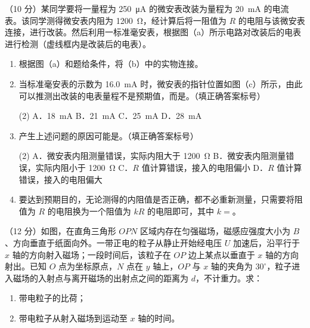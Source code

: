 \begin{question}
（10 分）某同学要将一量程为 \SI{250}{\micro\ampere} 的微安表改装为量程为 \SI{20}{\milli\ampere} 的电流表。该同学测得微安表内阻为 \SI{1200}{\ohm}，经计算后将一阻值为 $R$ 的电阻与该微安表连接，进行改装。然后利用一标准毫安表，根据图（a）所示电路对改装后的电表进行检测（虚线框内是改装后的电表）。


\begin{enumerate}[leftmargin=2em, label=(\arabic*)]
  \item 根据图（a）和题给条件，将（b）中的实物连接。
  \item 当标准毫安表的示数为 \SI{16.0}{\milli\ampere} 时，微安表的指针位置如图（c）所示，由此可以推测出改装的电表量程不是预期值，而是\gkblank。（填正确答案标号）
        \begin{gkopts}(2)
          \task A．\SI{18}{\milli\ampere}
          \task B．\SI{21}{\milli\ampere}
          \task C．\SI{25}{\milli\ampere}
          \task D．\SI{28}{\milli\ampere}
        \end{gkopts}
  \item 产生上述问题的原因可能是\gkblank。（填正确答案标号）
        \begin{gkopts}(2)
          \task A．微安表内阻测量错误，实际内阻大于 \SI{1200}{\ohm}
          \task B．微安表内阻测量错误，实际内阻小于 \SI{1200}{\ohm}
          \task C．$R$ 值计算错误，接入的电阻偏小
          \task D．$R$ 值计算错误，接入的电阻偏大
        \end{gkopts}
  \item 要达到预期目的，无论测得的内阻值是否正确，都不必重新测量，只需要将阻值为 $R$ 的电阻换为一个阻值为 $kR$ 的电阻即可，其中 $k=$\gkblank。
\end{enumerate}

\end{question}

\begin{question}
（12 分）如图，在直角三角形 $OPN$ 区域内存在匀强磁场，磁感应强度大小为 $B$、方向垂直于纸面向外。一带正电的粒子从静止开始经电压 $U$ 加速后，沿平行于 $x$ 轴的方向射入磁场；一段时间后，该粒子在 $OP$ 边上某点以垂直于 $x$ 轴的方向射出。已知 $O$ 点为坐标原点，$N$ 点在 $y$ 轴上，$OP$ 与 $x$ 轴的夹角为 $30^{\circ}$，粒子进入磁场的入射点与离开磁场的出射点之间的距离为 $d$，不计重力。求：
\begin{enumerate}[leftmargin=2em, label=(\arabic*)]
  \item 带电粒子的比荷；
  \item 带电粒子从射入磁场到运动至 $x$ 轴的时间。
\end{enumerate}

\end{question}


